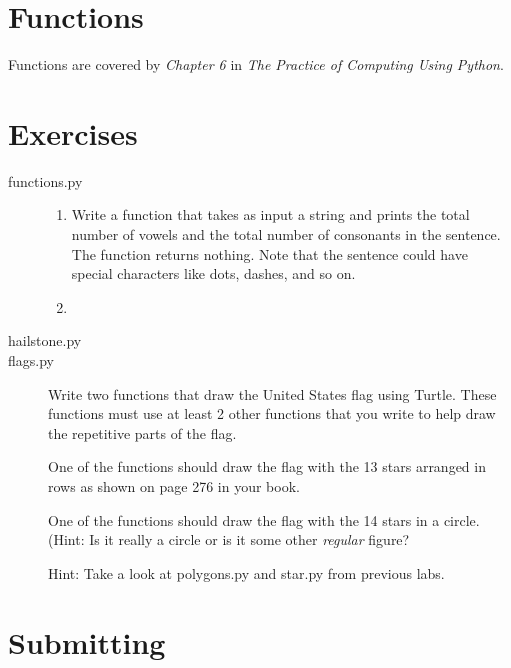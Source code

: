 \documentclass[11pt]{cselabheader}
\begin{document}
\section{Functions}

Functions are covered by \emph{Chapter 6} in \emph{The Practice of Computing
Using Python}.

\section{Exercises}
\label{sec:ex}

\begin{description}
  \item[functions.py] \hfill
    
    \begin{enumerate}
      \item Write a function that takes as input a string and prints the total
        number of vowels and the total number of consonants in the sentence. The
        function returns nothing. Note that the sentence could have special
        characters like dots, dashes, and so on.

      \item 

    \end{enumerate}

  \item[hailstone.py]

  \item[flags.py] 

    Write two functions that draw the United States flag using Turtle.
    These functions must use at least 2 other functions that you write
    to help draw the repetitive parts of the flag.

    One of the functions should draw the flag with the 13 stars arranged
    in rows as shown on page 276 in your book.

    One of the functions should draw the flag with the 14 stars in a circle.
    (Hint: Is it really a circle or is it some other \emph{regular} figure?
    
    Hint: Take a look at polygons.py and star.py from previous labs.
\end{description} 

\section{Submitting}
\end{document}
